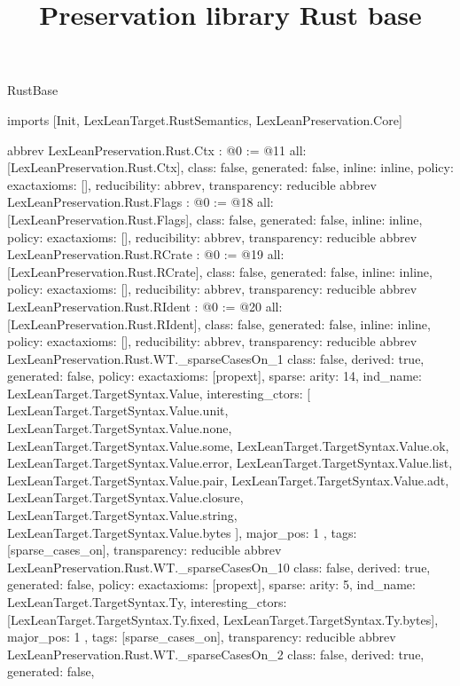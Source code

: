 \begin{lexlean}{RustBase}
\title{Preservation library Rust base}
\begin{coremodule}
imports [Init, LexLeanTarget.RustSemantics, LexLeanPreservation.Core]

abbrev LexLeanPreservation.Rust.Ctx : @0 := @11 {
  all: [LexLeanPreservation.Rust.Ctx],
  class: false,
  generated: false,
  inline: inline,
  policy: exact{axioms: []},
  reducibility: abbrev{},
  transparency: reducible
}
abbrev LexLeanPreservation.Rust.Flags : @0 := @18 {
  all: [LexLeanPreservation.Rust.Flags],
  class: false,
  generated: false,
  inline: inline,
  policy: exact{axioms: []},
  reducibility: abbrev{},
  transparency: reducible
}
abbrev LexLeanPreservation.Rust.RCrate : @0 := @19 {
  all: [LexLeanPreservation.Rust.RCrate],
  class: false,
  generated: false,
  inline: inline,
  policy: exact{axioms: []},
  reducibility: abbrev{},
  transparency: reducible
}
abbrev LexLeanPreservation.Rust.RIdent : @0 := @20 {
  all: [LexLeanPreservation.Rust.RIdent],
  class: false,
  generated: false,
  inline: inline,
  policy: exact{axioms: []},
  reducibility: abbrev{},
  transparency: reducible
}
abbrev LexLeanPreservation.Rust.WT._sparseCasesOn_1 {
  class: false,
  derived: true,
  generated: false,
  policy: exact{axioms: [propext]},
  sparse: {
    arity: 14,
    ind_name: LexLeanTarget.TargetSyntax.Value,
    interesting_ctors: [
      LexLeanTarget.TargetSyntax.Value.unit,
      LexLeanTarget.TargetSyntax.Value.none,
      LexLeanTarget.TargetSyntax.Value.some,
      LexLeanTarget.TargetSyntax.Value.ok,
      LexLeanTarget.TargetSyntax.Value.error,
      LexLeanTarget.TargetSyntax.Value.list,
      LexLeanTarget.TargetSyntax.Value.pair,
      LexLeanTarget.TargetSyntax.Value.adt,
      LexLeanTarget.TargetSyntax.Value.closure,
      LexLeanTarget.TargetSyntax.Value.string,
      LexLeanTarget.TargetSyntax.Value.bytes
    ],
    major_pos: 1
  },
  tags: [sparse_cases_on],
  transparency: reducible
}
abbrev LexLeanPreservation.Rust.WT._sparseCasesOn_10 {
  class: false,
  derived: true,
  generated: false,
  policy: exact{axioms: [propext]},
  sparse: {
    arity: 5,
    ind_name: LexLeanTarget.TargetSyntax.Ty,
    interesting_ctors: [LexLeanTarget.TargetSyntax.Ty.fixed, LexLeanTarget.TargetSyntax.Ty.bytes],
    major_pos: 1
  },
  tags: [sparse_cases_on],
  transparency: reducible
}
abbrev LexLeanPreservation.Rust.WT._sparseCasesOn_2 {
  class: false,
  derived: true,
  generated: false,
}
\end{coremodule}
\end{lexlean}
